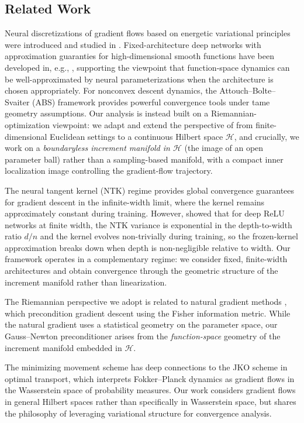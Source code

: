 \documentclass[twoside,11pt]{article}
\newcommand{\calH}{\mathcal{H}}
\begin{document}
\iffalse
\subsection{Related Work}
Neural discretizations of gradient flows based on energetic variational principles were introduced and studied in \citet{HuEnergetic2024}. Fixed-architecture deep networks with approximation guaranties for high-dimensional smooth functions have been developed in, e.g., \citet{JMLR:v23:21-1404,maiti2024optimal}, supporting the viewpoint that function-space dynamics can be well-approximated by neural parameterizations when the architecture is chosen appropriately. For nonconvex descent dynamics, the Attouch--Bolte--Svaiter (ABS) framework \citep{attouch2013convergence} provides powerful convergence tools under tame geometry assumptions. Our analysis is instead built on a Riemannian-optimization viewpoint: we adapt and extend the perspective of \citet{cayci2025riemannian} from finite-dimensional Euclidean settings to a continuous Hilbert space $\calH$, and crucially, we work on a \emph{boundaryless increment manifold in $\calH$} (the image of an open parameter ball) rather than a sampling-based manifold, with a compact inner localization image controlling the gradient-flow trajectory.

The neural tangent kernel (NTK) regime \citep{jacot2018neural} provides global convergence guarantees for gradient descent in the infinite-width limit, where the kernel remains approximately constant during training. However, \citet{hanin2019finite} showed that for deep ReLU networks at finite width, the NTK variance is exponential in the depth-to-width ratio $d/n$ and the kernel evolves non-trivially during training, so the frozen-kernel approximation breaks down when depth is non-negligible relative to width. Our framework operates in a complementary regime: we consider fixed, finite-width architectures and obtain convergence through the geometric structure of the increment manifold rather than linearization.

The Riemannian perspective we adopt is related to natural gradient methods \citep{amari1998natural}, which precondition gradient descent using the Fisher information metric. While the natural gradient uses a statistical geometry on the parameter space, our Gauss--Newton preconditioner arises from the \emph{function-space} geometry of the increment manifold embedded in $\calH$.

The minimizing movement scheme has deep connections to the JKO scheme \citep{jordan1998variational} in optimal transport, which interprets Fokker--Planck dynamics as gradient flows in the Wasserstein space of probability measures. Our work considers gradient flows in general Hilbert spaces rather than specifically in Wasserstein space, but shares the philosophy of leveraging variational structure for convergence analysis.
\end{document}
